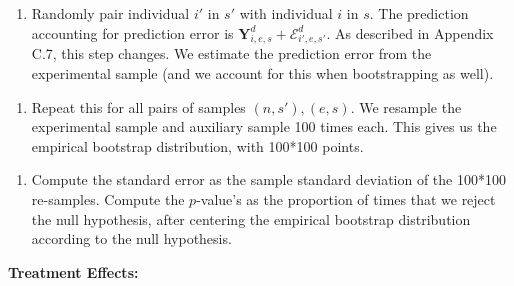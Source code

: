\documentclass[static]{JJH-Beamer}
\begin{document}
\begin{frame}

\begin{enumerate}[7.]
\item Randomly pair individual $i'$ in $s'$ with individual $i$ in $s$. The prediction accounting for prediction error is $\bm{Y}_{i,e,s}^d + \bm{\mathcal{E}}_{i',e,s'}^d$. As described in Appendix C.7, this step changes. We estimate the prediction error from the experimental sample (and we account for this when bootstrapping as well).
\end{enumerate}

\end{frame}

\begin{frame}

\begin{enumerate}[8.]
\item Repeat this for all pairs of samples $(n,s'), (e,s)$. We resample the experimental sample and auxiliary sample 100 times each. This gives us the empirical bootstrap distribution, with 100*100 points.
\end{enumerate}

\end{frame}

\begin{frame}

\begin{enumerate}[9.]
\item Compute the standard error as the sample standard deviation of the 100*100 re-samples. Compute the $p$-value's as the proportion of times that we reject the null hypothesis, after centering the empirical bootstrap distribution according to the null hypothesis.
\end{enumerate}

\end{frame}

\begin{frame}

\begin{center}
\textbf{Treatment Effects:}\label{little-TE}
\end{center}

\end{frame}
\end{document}
